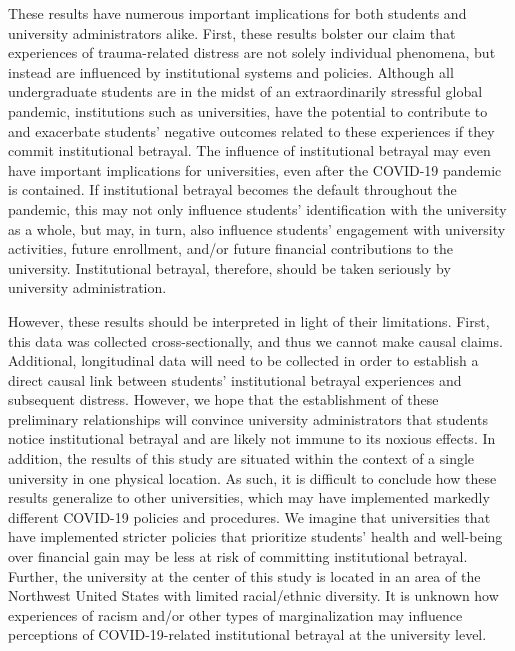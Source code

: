 \documentclass[
  english,
  man, noextraspace]{apa6}
\begin{document}
These results have numerous important implications for both students and university administrators alike. First, these results bolster our claim that experiences of trauma-related distress are not solely individual phenomena, but instead are influenced by institutional systems and policies. Although all undergraduate students are in the midst of an extraordinarily stressful global pandemic, institutions such as universities, have the potential to contribute to and exacerbate students' negative outcomes related to these experiences if they commit institutional betrayal. The influence of institutional betrayal may even have important implications for universities, even after the COVID-19 pandemic is contained. If institutional betrayal becomes the default throughout the pandemic, this may not only influence students' identification with the university as a whole, but may, in turn, also influence students' engagement with university activities, future enrollment, and/or future financial contributions to the university. Institutional betrayal, therefore, should be taken seriously by university administration.

However, these results should be interpreted in light of their limitations. First, this data was collected cross-sectionally, and thus we cannot make causal claims. Additional, longitudinal data will need to be collected in order to establish a direct causal link between students' institutional betrayal experiences and subsequent distress. However, we hope that the establishment of these preliminary relationships will convince university administrators that students notice institutional betrayal and are likely not immune to its noxious effects. In addition, the results of this study are situated within the context of a single university in one physical location. As such, it is difficult to conclude how these results generalize to other universities, which may have implemented markedly different COVID-19 policies and procedures. We imagine that universities that have implemented stricter policies that prioritize students' health and well-being over financial gain may be less at risk of committing institutional betrayal. Further, the university at the center of this study is located in an area of the Northwest United States with limited racial/ethnic diversity. It is unknown how experiences of racism and/or other types of marginalization may influence perceptions of COVID-19-related institutional betrayal at the university level.
\end{document}
